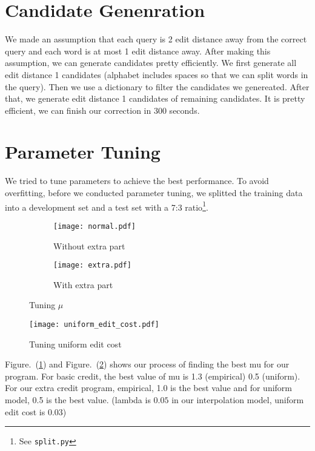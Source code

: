 \documentclass{article}
\begin{document}
\section{Candidate Genenration}

We made an assumption that each query is 2 edit distance away from the correct query and each word is at most 1 edit distance away. After making this assumption, we can generate candidates pretty efficiently. We first generate all edit distance 1 candidates (alphabet includes spaces so that we can split words in the query). Then we use a dictionary to filter the candidates we genereated. After that, we generate edit distance 1 candidates of remaining candidates. It is pretty efficient, we can finish our correction in 300 seconds.

\section{Parameter Tuning}

We tried to tune parameters to achieve the best performance. To avoid overfitting, before we conducted parameter tuning, we splitted the training data into a development set and a test set with a 7:3 ratio\footnote{See \texttt{split.py}}.

\begin{figure}[!htb]
  \centering
  \begin{subfigure}{.5\textwidth}
      \centering
      \texttt{[image: normal.pdf]}
      \caption{Without extra part}
      \label{fig:mu-normal}
  \end{subfigure}%
  \begin{subfigure}{.5\textwidth}
      \centering
      \texttt{[image: extra.pdf]}
      \caption{With extra part}
      \label{fig:mu-extra}
  \end{subfigure}
  \caption{Tuning $\mu$}
  \label{fig:mu}
\end{figure}

\begin{figure}[!htb]
  \centering
  \texttt{[image: uniform\_edit\_cost.pdf]}
  \caption{Tuning uniform edit cost}
  \label{fig:uniform-edit-cost}
\end{figure}

Figure.~(\ref{fig:mu-normal}) and Figure.~(\ref{fig:mu-extra}) shows our process of finding the best mu for our program. For basic credit, the best value of mu is 1.3 (empirical) 0.5 (uniform). For our extra credit program, empirical, 1.0 is the best value and for uniform model, 0.5 is the best value. (lambda is $0.05$ in our interpolation model, uniform edit cost is 0.03)
\end{document}

